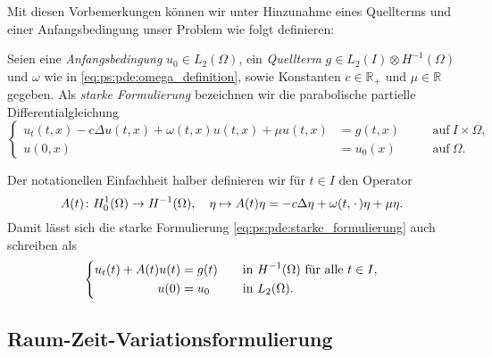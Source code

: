 Mit diesen Vorbemerkungen können wir unter Hinzunahme eines Quellterms und einer Anfangsbedingung unser Problem wie folgt definieren:

\begin{Definition}
\label{def:ps:pde:starke_formulierung}
    Seien eine \emph{Anfangsbedingung} $u_{0} \in L_{2}(\Omega)$, ein \emph{Quellterm} $g \in L_{2}(I) \otimes H^{-1}(\Omega)$ und $\omega$ wie in \cref{eq:ps:pde:omega_definition}, sowie Konstanten $c \in \mathbb{R}_{+}$ und $\mu \in \mathbb{R}$ gegeben.
    Als \emph{starke Formulierung} bezeichnen wir die parabolische partielle Differentialgleichung
    \begin{equation}
    \label{eq:ps:pde:starke_formulierung}
        \left\{
        \begin{aligned}
            u_{t}(t, x) - c \Delta u(t, x) + \omega(t, x) u(t, x) + \mu u(t, x) &= g(t, x) \quad &&\text{auf}~I \times \Omega,\\
            u(0, x) &= u_{0}(x) \quad &&\text{auf}~\Omega.
        \end{aligned}
        \right.
    \end{equation}
\end{Definition}

\begin{Bemerkung}
\label{bem:ps:pde:definition_operator_A}
    Der notationellen Einfachheit halber definieren wir für $t \in I$ den Operator
    \begin{equation}
    \label{eq:ps:pde:definition_operator_A}
        A(t) \colon H^{1}_{0}(\Omega) \to H^{-1}(\Omega), \quad \eta \mapsto A(t) \eta = - c \Delta \eta + \omega(t, \blank) \eta + \mu \eta.
    \end{equation}
    Damit lässt sich die starke Formulierung \cref{eq:ps:pde:starke_formulierung} auch schreiben als
    \begin{equation}
        \left\{
        \begin{aligned}
            u_t(t) + A(t)u(t) &= g(t) \quad &&\text{in}~H^{-1}(\Omega)~\fa t \in I,\\
            u(0) &= u_{0} \quad &&\text{in}~L_{2}(\Omega).
        \end{aligned}
        \right.
    \end{equation}
\end{Bemerkung}

\subsection{Raum-Zeit-Variationsformulierung} %
\label{sub:ps:rzvp:raum_zeit_variationsformulierung}

